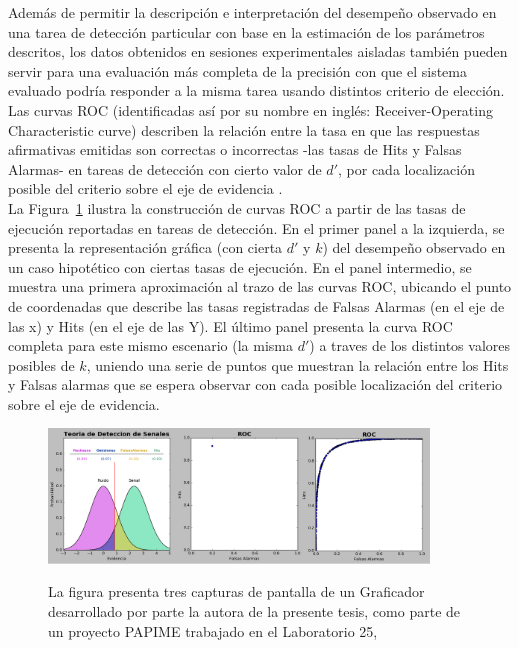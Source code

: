 Además de permitir la descripción e interpretación del desempeño observado en una tarea de detección particular con base en la estimación de los parámetros descritos, los datos obtenidos en sesiones experimentales aisladas también pueden servir para una evaluación más completa de la precisión con que el sistema evaluado podría responder a la misma tarea usando distintos criterio de elección. Las curvas ROC (identificadas así por su nombre en inglés: Receiver-Operating Characteristic curve) describen la relación entre la tasa en que las respuestas afirmativas emitidas son correctas o incorrectas -las tasas de Hits y Falsas Alarmas- en tareas de detección con cierto valor de $d'$, por cada localización posible del criterio sobre el eje de evidencia \parencite{McNicol2, Swets1973}.\\

La Figura~\ref{fig:Graf_ROC} ilustra la construcción de curvas ROC a partir de las tasas de ejecución reportadas en tareas de detección. En el primer panel a la izquierda, se presenta la representación gráfica (con cierta $d'$ y $k$) del desempeño observado en un caso hipotético con ciertas tasas de ejecución. En el panel intermedio, se muestra una primera aproximación al trazo de las curvas ROC, ubicando el punto de coordenadas que describe las tasas registradas de Falsas Alarmas (en el eje de las x) y Hits (en el eje de las Y). El último panel presenta la curva ROC completa para este mismo escenario (la misma $d'$) a traves de los distintos valores posibles de $k$, uniendo una serie de puntos que muestran la relación entre los Hits y Falsas alarmas que se espera observar con cada posible localización del criterio sobre el eje de evidencia.\\

\begin{figure}[th]
\centering
\includegraphics[width=0.90\textwidth]{Figures/Graficador_ROC12}\\
\caption[Ejemplo de Curva ROC]{La figura presenta tres capturas de pantalla de un Graficador desarrollado por parte la autora de la presente tesis, como parte de un proyecto PAPIME trabajado en el Laboratorio 25, \parencite{PAPIME}}
\label{fig:Graf_ROC}
\end{figure}

